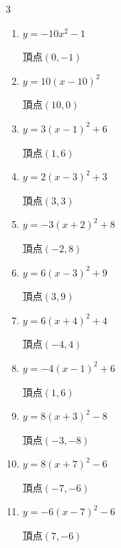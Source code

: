 \begin{multicols}{3}
\begin{enumerate}
        $\displaystyle 頂点\left( -4 , -1 \right)$

  \item $\displaystyle y=-10x^{2}-1$

        $\displaystyle 頂点\left( 0 , -1 \right)$

  \item $\displaystyle y=10\left( x-10\right)^{2}$

        $\displaystyle 頂点\left( 10 , 0 \right)$

  \item $\displaystyle y=3\left( x-1\right)^{2}+6$

        $\displaystyle 頂点\left( 1 , 6 \right)$

  \item $\displaystyle y=2\left( x-3\right)^{2}+3$

        $\displaystyle 頂点\left( 3 , 3 \right)$

  \item $\displaystyle y=-3\left( x+2\right)^{2}+8$

        $\displaystyle 頂点\left( -2 , 8 \right)$

\columnbreak %

\resetques

  \item $\displaystyle y=6\left( x-3\right)^{2}+9$

        $\displaystyle 頂点\left( 3 , 9 \right)$

  \item $\displaystyle y=6\left( x+4\right)^{2}+4$

        $\displaystyle 頂点\left( -4 , 4 \right)$

  \item $\displaystyle y=-4\left( x-1\right)^{2}+6$

        $\displaystyle 頂点\left( 1 , 6 \right)$

  \item $\displaystyle y=8\left( x+3\right)^{2}-8$

        $\displaystyle 頂点\left( -3 , -8 \right)$

  \item $\displaystyle y=8\left( x+7\right)^{2}-6$

        $\displaystyle 頂点\left( -7 , -6 \right)$

  \item $\displaystyle y=-6\left( x-7\right)^{2}-6$

        $\displaystyle 頂点\left( 7 , -6 \right)$


\end{enumerate}
\end{multicols}
